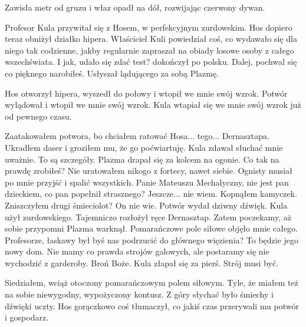 Zawisła metr od gruzu i właz opadł na dół, rozwijając czerwony dywan.
\begin{dialogue}
\ds{}  \dm{} Profesor Kula przywitał się z Hosem, w perfekcyjnym zurdowskim. \dm{} 
\ds{}  \dm{} Hos dopiero teraz obniżył działko hipera.
\ds{}  \dm{} 
Właściciel Kuli powiedział coś, co wydawało się dla niego tak codzienne, jakby regularnie zapraszał na obiady losowe osoby z całego wszechświata. \dm{} 
I jak, udało się zdać test? \dm{} dokończył po polsku.
\ds{} Dalej, pochwal się co pięknego narobiłeś. \dm{} Usłyszał lądującego za sobą Plazmę. \dm{} 
\end{dialogue}

Hos otworzył hipera, wyszedł do połowy i wtopił we mnie swój wzrok.
Potwór wylądował i wtopił we mnie swój wzrok.
Kula wtapiał się we mnie swój wzrok już od pewnego czasu.

\begin{dialogue}
\ds{} Zaatakowałem potwora, bo chciałem ratować Hosa... tego... Dernasztapa. Ukradłem daser i groziłem mu, że go poćwiartuję. \dm{} Kula zdawał słuchać mnie uważnie.
\ds{} To są szczegóły. \dm{} Plazma drapał się za kolcem na ogonie. \dm{} Co tak na prawdę zrobiłeś?
\ds{} Nie uratowałem nikogo z fortecy, nawet siebie. Ognisty musiał po mnie przyjść i spalić wszystkich.
\ds{} Panie Mateuszu Mechalyczny, nie jest pan dzieckiem, co pan popełnił strasznego?
\ds{} Jeszcze... nie wiem. \dm{} Kopnąłem kamyczek. \dm{} Zniszczyłem drugi śmieciolot?
\ds{} On nie wie. \dm{} Potwór wydał dziwny dźwięk.
\ds{}  \dm{} Kula użył zurdowskiego.
\ds{}  \dm{} Tajemniczo rozłożył ręce Dernasztap.
\ds{} Zatem poczekamy, aż sobie przypomni \dm{} Plazma warknął. Pomarańczowe pole siłowe objęło mnie całego. \dm{} 
Profesorze, łaskawy był byś nas podrzucić do głównego więzienia? To będzie jego nowy dom.
Nie mamy co prawda strojów galowych, ale postaramy się nie wychodzić z garderoby.
\ds{} Broń Boże. \dm{} Kula złapał się za pierś. \dm{} Strój musi być.
\end{dialogue}

Siedziałem, wciąż otoczony pomarańczowym polem siłowym. Tyle, że miałem też na sobie niewygodny, wypożyczony kontusz.
Z góry słychać było śmiechy i dźwięki uczty.
Hos gorączkowo coś tłumaczył, co jakiś czas przerywali mu potwór i gospodarz.

